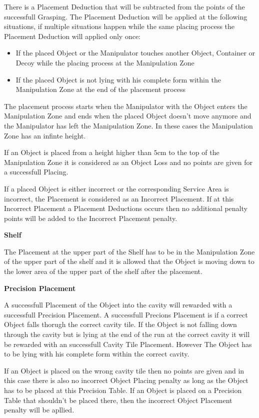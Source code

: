 There is a Placement Deduction that will be subtracted from the points of the successfull Grasping. The Placement Deduction will be applied at the following situations, if multiple situations happen while the same placing process the Placement Deduction will applied only once:

\begin{itemize}
	\item If the placed Object or the Manipulator touches another Object, Container or Decoy while the placing process at the Manipulation Zone 
	\item If the placed Object is not lying with his complete form within the Manipulation Zone at the end of the placement process
\end{itemize}

The placement process starts when the Manipulator with the Object enters the Manipulation Zone and ends when the placed Object doesn't move anymore and the Manipulator has left the Manipulation Zone. In these cases the Manipulation Zone has an infinte height.


If an Object is placed from a height higher than $5\si{\centi\meter}$ to the top of the Manipulation Zone it is considered as an Object Loss and no points are given for a successfull Placing.

If a placed Object is either incorrect or the corresponding Service Area is incorrect, the Placement is considered as an Incorrect Placement. If at this Incorrect Placement a Placement Deductions occurs then no additional penalty points will be added to the Incorrect Placement penalty.

\textbf{Shelf}

The Placement at the upper part of the Shelf has to be in the Manipulation Zone of the upper part of the shelf and it is allowed that the Object is moving down to the lower area of the upper part of the shelf after the placement. 


\textbf{Precision Placement}

A successfull Placement of the Object into the cavity will rewarded with a successfull Precision Placement. A successfull Precions Placement is if a  correct Object falls thorugh the correct cavity tile. If the Object is not falling down through the cavity but is lying at the end of the run at the correct cavity it will be rewarded with an successfull Cavity Tile Placement. However The Object has to be lying with his complete form within the correct cavity.

If an Object is placed on the wrong cavity tile then no points are given and in this case there is also no incorrect Object Placing penalty as long as the Object has to be placed at this Precision Table. If an Object is placed on a Precision Table that shouldn't be placed there, then the incorrect Object Placement penalty will be apllied. 

